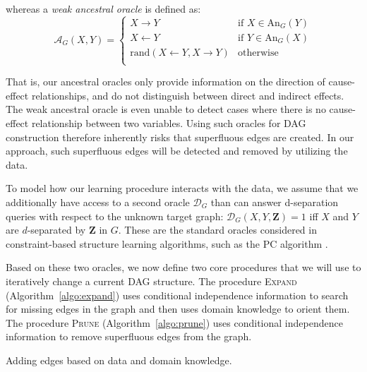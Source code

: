 \documentclass{uai2025} %
\begin{document}
whereas a \emph{weak ancestral oracle} is defined as:
$$
\mathcal{A}_G(X,Y)=\begin{cases}
 X \to Y & \textrm{if } X \in \textrm{An}_G(Y) \\
 X \gets Y & \textrm{if } Y \in \textrm{An}_G(X) \\
 \textrm{rand}(X \gets Y, X \to Y) & \textrm{otherwise} \\
\end{cases}
$$

That is, our ancestral oracles only provide information on the direction of cause-effect
relationships, and do not distinguish between direct and indirect effects. 
The weak ancestral oracle is even unable to detect cases where there is no cause-effect
relationship between two variables. Using such oracles for DAG construction therefore 
inherently risks that superfluous edges are created. In our approach, such superfluous edges
will be detected and removed by utilizing the data. 

To model how our learning procedure interacts with the data, we assume that we
additionally have access to a second oracle $\mathcal{D}_G$ than can answer d-separation
queries with respect to the unknown target graph:
$\mathcal{D}_G(X,Y,\mathbf{Z})=1$ iff $X$ and $Y$ are $d$-separated by $\mathbf{Z}$ in 
$G$. These are the standard oracles considered in constraint-based structure learning
algorithms, such as the PC algorithm \cite{Spirtes2001}. 

Based on these two oracles, we now define two core procedures that we will use to 
iteratively change a current DAG structure. The procedure 
\textsc{Expand} (Algorithm~\ref{algo:expand}) uses conditional independence
information to search for missing edges in the graph and then uses domain
knowledge to orient them. The procedure \textsc{Prune} (Algorithm~\ref{algo:prune}) uses
conditional independence information to remove superfluous edges from the
graph.

\begin{algorithm}[h]
\DontPrintSemicolon
\SetAlgoLined
{}
\caption{Adding edges based on data and domain knowledge.}
\label{algo:expand}
\end{algorithm}
\end{document}
